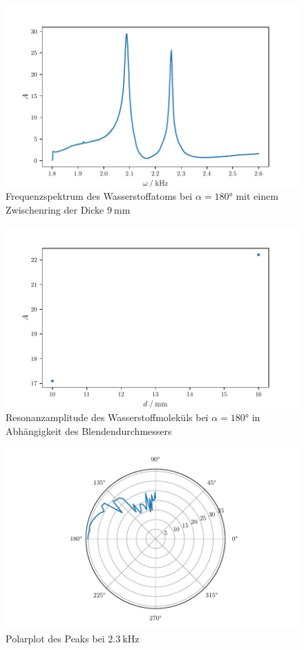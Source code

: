 \begin{figure}
    \centering
    \includegraphics{build/h9ring.pdf}
    \caption{Frequenzspektrum des Wasserstoffatoms bei $\alpha = \ang{180}$ mit einem Zwischenring der Dicke $\qty{9}{\milli\meter}$}
    \label{pic:h9ring}
\end{figure}
\begin{figure}
    \centering
    \includegraphics{build/h2dia.pdf}
    \caption{Resonanzamplitude des Wasserstoffmoleküls bei $\alpha = \ang{180}$ in Abhängigkeit des Blendendurchmessers}
    \label{pic:h9ring}
\end{figure}
\begin{figure}
    \centering
    \includegraphics{build/h2varangle.pdf}
    \caption{Polarplot des Peaks bei $\qty{2.3}{\kilo\hertz}$}
    \label{pic:h9ring}
\end{figure}
